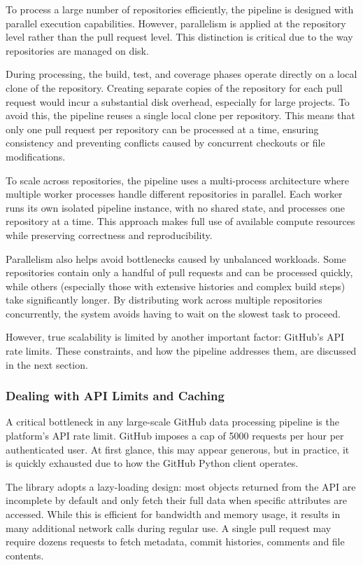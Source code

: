 To process a large number of repositories efficiently, the pipeline is designed with parallel
execution capabilities. However, parallelism is applied at the repository level rather than the pull
request level. This distinction is critical due to the way repositories are managed on disk.

During processing, the build, test, and coverage phases operate directly on a local clone of the
repository. Creating separate copies of the repository for each pull request would incur a
substantial disk overhead, especially for large projects. To avoid this, the pipeline reuses a
single local clone per repository. This means that only one pull request per repository can be
processed at a time, ensuring consistency and preventing conflicts caused by concurrent checkouts or
file modifications.

To scale across repositories, the pipeline uses a multi-process architecture where multiple worker
processes handle different repositories in parallel. Each worker runs its own isolated pipeline
instance, with no shared state, and processes one repository at a time. This approach makes full use
of available compute resources while preserving correctness and reproducibility.

Parallelism also helps avoid bottlenecks caused by unbalanced workloads. Some repositories contain
only a handful of pull requests and can be processed quickly, while others (especially those with
extensive histories and complex build steps) take significantly longer. By distributing work across
multiple repositories concurrently, the system avoids having to wait on the slowest task to proceed.

However, true scalability is limited by another important factor: GitHub’s API rate limits. These
constraints, and how the pipeline addresses them, are discussed in the next section.

\subsubsection{Dealing with API Limits and Caching}

A critical bottleneck in any large-scale GitHub data processing pipeline is the platform's API rate
limit. GitHub imposes a cap of 5000 requests per hour per authenticated user. At first glance, this
may appear generous, but in practice, it is quickly exhausted due to how the GitHub Python client
operates.

The library adopts a lazy-loading design: most objects returned from the API are incomplete by
default and only fetch their full data when specific attributes are accessed. While this is
efficient for bandwidth and memory usage, it results in many additional network calls during regular
use. A single pull request may require dozens requests to fetch metadata, commit histories,
comments and file contents.

